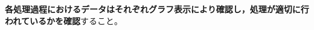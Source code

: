 \documentclass{jsarticle}
\begin{document}
\textbf{各処理過程におけるデータはそれぞれグラフ表示により確認し，処理が適切に行われているかを確認}すること。




\end{document}
